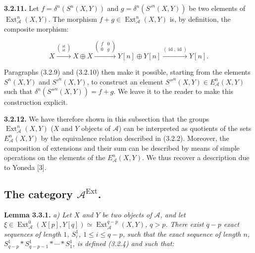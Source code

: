 \clearpage
{}%
\begingroup\small\setlength{\parskip}{0pt}\setlength{\emergencystretch}{1.5em}
\setlength{\abovedisplayskip}{4pt plus 2pt minus 2pt}%
\setlength{\belowdisplayskip}{4pt plus 2pt minus 2pt}%

\medskip\noindent\textbf{3.2.11.}\quad
Let $f=\delta^n(S^n(X,Y))$ and $g=\delta^n({S'}^n(X,Y))$ be two elements
of $\operatorname{Ext}_{\mathcal A}^{n}(X,Y)$. The morphism
$f+g\in\operatorname{Ext}_{\mathcal A}^{n}(X,Y)$ is, by definition, the
composite morphism:

\[
X\xrightarrow{\binom{\operatorname{id}}{\operatorname{id}}}X\oplus X
\xrightarrow{\begin{pmatrix}f&0\\0&g\end{pmatrix}}
Y[n]\oplus Y[n]
\xrightarrow{(\operatorname{id},\operatorname{id})}Y[n].
\]

Paragraphs (3.2.9) and (3.2.10) then make it possible, starting from the
elements $S^n(X,Y)$ and ${S'}^n(X,Y)$, to construct an element
${S''}^n(X,Y)\in E_{\mathcal A}^{n}(X,Y)$ such that
$\delta^n({S''}^n(X,Y))=f+g$. We leave it to the reader to make this
construction explicit.

\medskip\noindent\textbf{3.2.12.}\quad
We have therefore shown in this subsection that the groups
$\operatorname{Ext}_{\mathcal A}^{n}(X,Y)$ ($X$ and $Y$ objects of
$\mathcal A$) can be interpreted as quotients of the sets
$E_{\mathcal A}^{n}(X,Y)$ by the equivalence relation described in (3.2.2).
Moreover, the composition of extensions and their sum can be described by
means of simple operations on the elements of the
$E_{\mathcal A}^{n}(X,Y)$. We thus recover a description due to Yoneda [3].

\subsection{The category
\texorpdfstring{$\mathcal A^{\operatorname{Ext}}$}{A Ext}.}

\medskip\noindent\textbf{Lemma 3.3.1.}\quad
\textit{a) Let $X$ and $Y$ be two objects of $\mathcal A$, and let
$\xi\in\operatorname{Ext}_{\mathcal A}^{0}(X[p],Y[q])\simeq
\operatorname{Ext}_{\mathcal A}^{q-p}(X,Y)$, $q>p$. There exist $q-p$ exact
sequences of length $1$, $S_i^1$, $1\leq i\leq q-p$, such that the exact
sequence of length $n$,
$S_{q-p}^1*S_{q-p-1}^1*\cdots*S_1^1$, is defined (3.2.4) and such that:}

